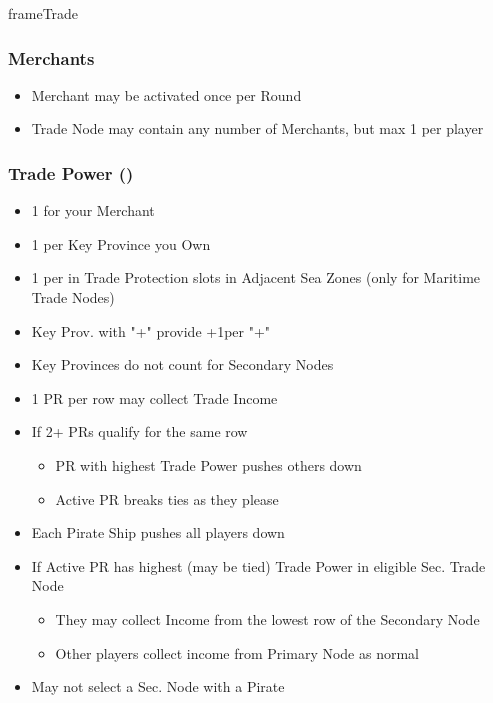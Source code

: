 \documentclass[10pt]{article}
\begin{document}
\begin{dynamiccontents*}{frameTrade}
	\begin{multicols}{2}
		\subsubsection*{Merchants }
		\begin{itemize}
			\item Merchant may be activated once per Round
			\item Trade Node may contain any number of Merchants, but max 1 per player
		\end{itemize}

		\subsubsection*{Trade Power (\tradepower) }
		\begin{itemize}
			\item 1 \tradepower for your Merchant
			\item 1 \tradepower per Key Province you Own
			\item 1 \tradepower per \ship in Trade Protection slots in Adjacent Sea Zones (only for Maritime Trade Nodes)
			\item Key Prov. with "+" provide +1\tradepower per "+"
			\item Key Provinces do not count for Secondary Nodes
		\end{itemize}
		\begin{itemize}
			\item 1 PR per row may collect Trade Income
			\item If 2+ PRs qualify for the same row
			\begin{itemize}
				\item PR with highest Trade Power pushes others down
				\item Active PR breaks ties as they please
			\end{itemize}
			\item Each Pirate Ship pushes all players down 
		\end{itemize}
		\begin{itemize}
			\item If Active PR has highest (may be tied) Trade Power in eligible Sec. Trade Node
			\begin{itemize}
				\item They may collect Income from the lowest row of the Secondary Node
				\item Other players collect income from Primary Node as normal
			\end{itemize}
			\item May not select a Sec. Node with a Pirate
		\end{itemize}
	\end{multicols}
\end{dynamiccontents*}
\end{document}
